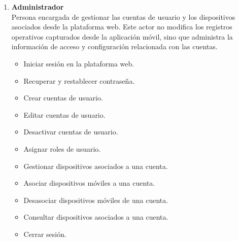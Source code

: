 \begin{enumerate}
    \item \textbf{Administrador}\\
    Persona encargada de gestionar las cuentas de usuario y los dispositivos asociados desde la plataforma web. Este actor no modifica los registros operativos capturados desde la aplicación móvil, sino que administra la información de acceso y configuración relacionada con las cuentas.
        \begin{itemize}
            \item Iniciar sesión en la plataforma web.
            \item Recuperar y restablecer contraseña.
            \item Crear cuentas de usuario.
            \item Editar cuentas de usuario.
            \item Desactivar cuentas de usuario.
            \item Asignar roles de usuario.
            \item Gestionar dispositivos asociados a una cuenta.
            \item Asociar dispositivos móviles a una cuenta.
            \item Desasociar dispositivos móviles de una cuenta.
            \item Consultar dispositivos asociados a una cuenta.
            \item Cerrar sesión.
        \end{itemize}
\end{enumerate}
